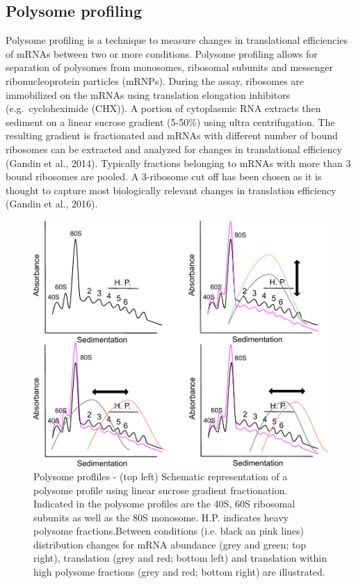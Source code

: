 \documentclass[
  12pt,
  openany]{book}
\begin{document}
\subsection{Polysome profiling}

Polysome profiling is a technique to measure changes in translational efficiencies of mRNAs between two or more conditions. Polysome profiling allows for separation of polysomes from monosomes, ribosomal subunits and messenger ribonucleoprotein particles (mRNPs). During the assay, ribosomes are immobilized on the mRNAs using translation elongation inhibitors (e.g.~cycloheximide (CHX)). A portion of cytoplasmic RNA extracts then sediment on a linear sucrose gradient (5-50\%) using ultra centrifugation. The resulting gradient is fractionated and mRNAs with different number of bound ribosomes can be extracted and analyzed for changes in translational efficiency (Gandin et al., 2014). Typically fractions belonging to mRNAs with more than 3 bound ribosomes are pooled. A 3-ribosome cut off has been chosen as it is thought to capture most biologically relevant changes in translation efficiency (Gandin et al., 2016).

\begin{figure}
    \includegraphics[width=0.9\linewidth]{./figures/polysome_shifts.pdf}
  \caption{Polysome profliles -  (top left) Schematic representation of a polysome profile using linear sucrose gradient fractionation. Indicated in the polysome profiles are the 40S, 60S ribosomal subunits as well as the 80S monosome. H.P. indicates heavy polysome fractions.Between conditions (i.e. black an pink lines) distribution changes for mRNA abundance (grey and green; top right), translation (grey and red; bottom left) and translation within high polysome fractions (grey and red; bottom right) are illustrated. \label{fig:polysome}}
\end{figure}
\end{document}
